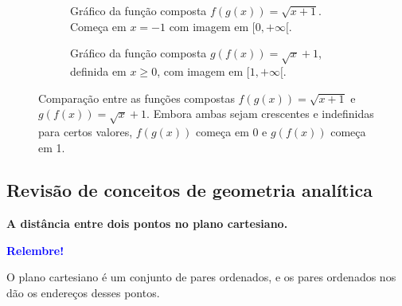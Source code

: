 \documentclass[12pt,openright,twoside,a4paper]{article}
\theoremstyle{definition}
\begin{document}
	\begin{figure}[h]
		\centering
		\begin{subfigure}[t]{0.48\textwidth}
			\centering
			\caption{Gráfico da função composta \( f(g(x)) = \sqrt{x + 1} \). Começa em \( x = -1 \) com imagem em \( [0, +\infty[ \).}
			\label{fig:fgx}
		\end{subfigure}
		\hfill
		\begin{subfigure}[t]{0.48\textwidth}
			\centering
			\caption{Gráfico da função composta \( g(f(x)) = \sqrt{x} + 1 \), definida em \( x \geq 0 \), com imagem em \( [1, +\infty[ \).}
			\label{fig:gfx}
		\end{subfigure}
		
		\caption{Comparação entre as funções compostas \( f(g(x)) = \sqrt{x + 1} \) e \( g(f(x)) = \sqrt{x} + 1 \). Embora ambas sejam crescentes e indefinidas para certos valores, \( f(g(x)) \) começa em 0 e \( g(f(x)) \) começa em 1.}
		\label{fig:comparacao-funcao-composta}
	\end{figure}
	
	
	\subsection{Revisão de conceitos de geometria analítica}
	
	\textbf{A distância entre dois pontos no plano cartesiano.}
	
	\begin{snugshade}
		\textbf{\textcolor{blue}{Relembre!}}
		
		O plano cartesiano é um conjunto de pares ordenados, e os pares ordenados nos dão os endereços desses pontos.
		
	\end{snugshade}
	
\end{document}
